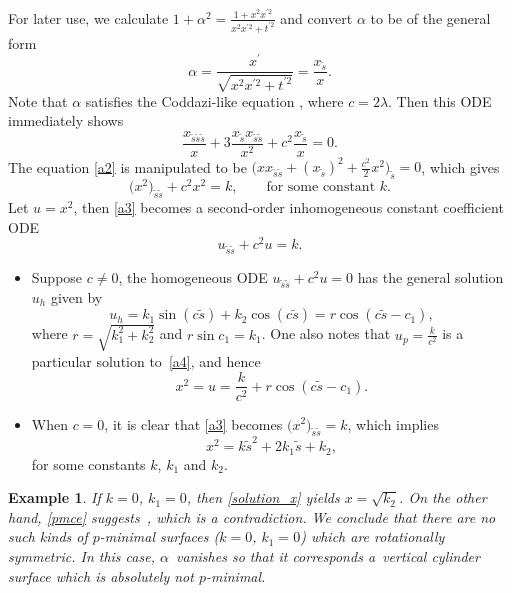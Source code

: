 \documentclass[10pt,a4paper]{amsart}
\numberwithin{equation}{section}
\newtheorem{Example}[Theorem]{Example}
\begin{document}
For later use, we calculate $1+\alpha^2=\frac{1+x^2x^{\prime 2}}{x^2x^{\prime 2}+t^{\prime 2}}$ and convert $\alpha$ to be of the general form
\begin{equation} \label{a1}
\alpha=\frac{x^{\prime }}{\sqrt{x^2x^{\prime 2}+t^{\prime 2}}}=\frac{
x_{\tilde s}}{x}.
\end{equation}
Note that $\alpha$ satisfies the Coddazi-like equation , where $c=2\lambda$. Then this ODE immediately shows
\begin{equation} \label{a2}
\frac{x_{\tilde s\tilde s\tilde s}}{x}+3\frac{x_{\tilde s}x_{\tilde s\tilde
s}}{x^2}+c^2\frac{x_{\tilde s}}{x}=0.
\end{equation}
The equation \eqref{a2} is manipulated to be
$
\bigl(xx_{\tilde s\tilde s}+(x_{\tilde s})^2+\frac{c^2}{2}x^2\bigr)_{\tilde s}=0$,
which gives
\begin{equation} \label{a3}
\big(x^2\big)_{\tilde s\tilde s}+c^2x^2=k,\qquad \mbox{for some constant $k$.}
\end{equation}
Let $u=x^2$, then \eqref{a3} becomes a second-order inhomogeneous constant
coefficient ODE
\begin{equation} \label{a4}
u_{\tilde s\tilde s}+c^2u=k.
\end{equation}
\begin{itemize}\itemsep=0pt
\item[(I)] Suppose $c\neq 0$, the homogeneous ODE $u_{\tilde s\tilde s}+c^2u=0$ has the
general solution $u_h$ given by
\begin{equation}\label{rk1}
u_h=k_1\sin(c\tilde s)+k_2\cos(c\tilde s)=r\cos(c\tilde s-c_1),
\end{equation}
where $r=\sqrt{k_1^2+k_2^2}$ and $r\sin c_1=k_1$. One also notes that $u_p=%
\frac{k}{c^2}$ is a particular solution to~\eqref{a4}, and hence
\begin{equation} \label{solution_u}
x^2=u=\frac{k}{c^2}+r\cos(c\tilde s-c_1).
\end{equation}

\item[(II)] When $c=0$, it is clear that \eqref{a3} becomes $\big(x^2\big)_{\tilde s\tilde s}=k$, which implies
\begin{equation}\label{solution_x}
x^2=k\tilde s^2+2k_1\tilde s+k_2,
\end{equation}
for some constants $k$, $k_{1}$ and $k_{2}$.
\end{itemize}
\begin{Example}
If $k=0$, $k_{1}=0$, then \eqref{solution_x} yields $x=\sqrt{k_2}$. On
the other hand, \eqref{pmce} suggests~,
which is a contradiction. We conclude that there are no such kinds of $p$-minimal surfaces ($k=0$, $k_{1}=0$) which are rotationally symmetric. In this case, $\alpha$~vanishes so that it corresponds a~vertical cylinder surface which is absolutely not $p$-minimal.
\end{Example}
\end{document}
